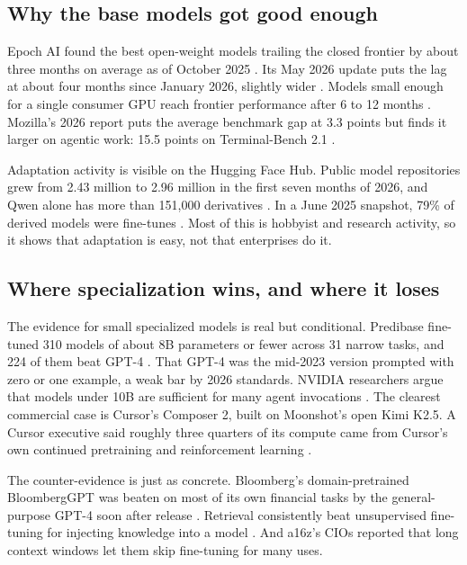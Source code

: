 \subsection{Why the base models got good enough}

 Epoch AI found the best open-weight models trailing the closed frontier by about three months on average as of October 2025 \citep{emberson2025lag}. Its May 2026 update puts the lag at about four months since January 2026, slightly wider \citep{edwards2026gap}. Models small enough for a single consumer GPU reach frontier performance after 6 to 12 months \citep{somala2025consumer}. Mozilla's 2026 report puts the average benchmark gap at 3.3 points but finds it larger on agentic work: 15.5 points on Terminal-Bench 2.1 \citep{uctoday2026mozilla}.

Adaptation activity is visible on the Hugging Face Hub. Public model repositories grew from 2.43 million to 2.96 million in the first seven months of 2026, and Qwen alone has more than 151,000 derivatives \citep{hf2026open}. In a June 2025 snapshot, 79\% of derived models were fine-tunes \citep{chen2026supply}. Most of this is hobbyist and research activity, so it shows that adaptation is easy, not that enterprises do it.

\subsection{Where specialization wins, and where it loses}

The evidence for small specialized models is real but conditional. Predibase fine-tuned 310 models of about 8B parameters or fewer across 31 narrow tasks, and 224 of them beat GPT-4 \citep{zhao2024loraland}. That GPT-4 was the mid-2023 version prompted with zero or one example, a weak bar by 2026 standards. NVIDIA researchers argue that models under 10B are sufficient for many agent invocations \citep{belcak2025slm}. The clearest commercial case is Cursor's Composer 2, built on Moonshot's open Kimi K2.5. A Cursor executive said roughly three quarters of its compute came from Cursor's own continued pretraining and reinforcement learning \citep{datacamp2026composer}.

The counter-evidence is just as concrete. Bloomberg's domain-pretrained BloombergGPT was beaten on most of its own financial tasks by the general-purpose GPT-4 soon after release \citep{li2023finance}. Retrieval consistently beat unsupervised fine-tuning for injecting knowledge into a model \citep{ovadia2024}. And a16z's CIOs reported that long context windows let them skip fine-tuning for many uses.


